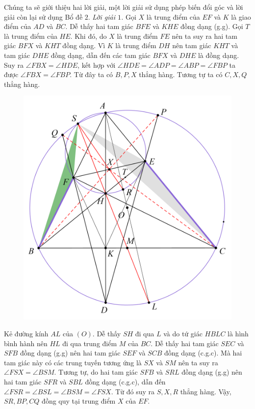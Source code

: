 \begin{multicols}{2}
	\vskip 0.1cm
	Chúng ta sẽ giới thiệu hai lời giải, một lời giải sử dụng phép biến đổi góc và lời giải còn lại sử dụng Bổ đề $2$.
	\vskip 0.1cm
	\textit{Lời giải $1$.} Gọi $X$ là trung điểm của $EF$ và $K$ là giao điểm của $AD$ và $BC$. Dễ thấy hai tam giác $BFE$ và $KHE$ đồng dạng (g.g). Gọi $T$ là trung điểm của $HE$. Khi đó, do $X$ là trung điểm $FE$ nên ta suy ra hai tam giác $BFX$ và $KHT$ đồng dạng. Vì $K$ là trung điểm $DH$ nên tam giác $KHT$ và tam giác $DHE$ đồng dạng, dẫn đến các tam giác $BFX$ và $DHE$ là đồng dạng. Suy ra  $\angle{FBX}= \angle{HDE}$, kết hợp với  $\angle{HDE}=\angle{ADP} = \angle{ABP}=\angle{FBP} $ ta được  $\angle{FBX}= \angle{FBP}.$ Từ đây ta có $B,P,X$ thẳng hàng. Tương tự ta có $C,X,Q$ thẳng hàng.
	\begin{figure}[H]
		\vspace*{-10pt}
		\centering
		\captionsetup{labelformat= empty, justification=centering}
		\includegraphics[width= 0.9\linewidth]{12}
		\vspace*{-15pt}
	\end{figure}
	Kẻ đường kính $AL$ của $(O)$. Dễ thấy $SH$ đi qua $L$ và do tứ giác $HBLC$ là hình bình hành nên $HL$ đi qua trung điểm $M$ của $BC$. Dễ thấy hai tam giác $SEC$ và $SFB$ đồng dạng (g.g) nên hai tam giác $SEF$ và $SCB$ đồng dạng (c.g.c). Mà hai tam giác này có các trung tuyến tương ứng là $SX$ và $SM$ nên ta suy ra $\angle FSX =  \angle BSM$. Tương tự, do hai tam giác $SFB$ và $SRL$ đồng dạng (g.g) nên hai tam giác $SFR$ và $SBL$ đồng dạng (c.g.c), dẫn đến  $\angle FSR=\angle BSL=\angle BSM=\angle FSX$. Từ đó suy ra $S,X,R$ thẳng hàng. Vậy, $SR,BP,CQ$ đồng quy tại trung điểm $X$ của $EF$.

\end{multicols}
